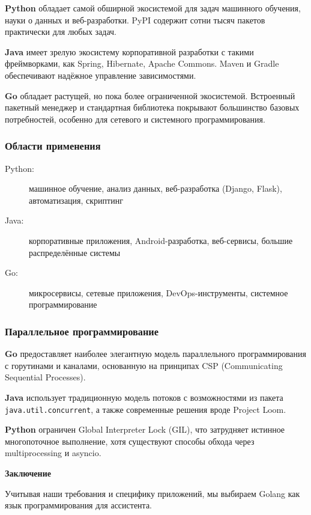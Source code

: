 \textbf{Python} обладает самой обширной экосистемой для задач машинного обучения, науки о данных и веб-разработки. PyPI содержит сотни тысяч пакетов практически для любых задач.

\textbf{Java} имеет зрелую экосистему корпоративной разработки с такими фреймворками, как Spring, Hibernate, Apache Commons. Maven и Gradle обеспечивают надёжное управление зависимостями.

\textbf{Go} обладает растущей, но пока более ограниченной экосистемой. Встроенный пакетный менеджер и стандартная библиотека покрывают большинство базовых потребностей, особенно для сетевого и системного программирования.

\subsubsection*{Области применения}

\begin{description}
    \item[Python:] машинное обучение, анализ данных, веб-разработка (Django, Flask), автоматизация, скриптинг
    \item[Java:] корпоративные приложения, Android-разработка, веб-сервисы, большие распределённые системы
    \item[Go:] микросервисы, сетевые приложения, DevOps-инструменты, системное программирование
\end{description}

\subsubsection*{Параллельное программирование}

\textbf{Go} предоставляет наиболее элегантную модель параллельного программирования с горутинами и каналами, основанную на принципах CSP (Communicating Sequential Processes).

\textbf{Java} использует традиционную модель потоков с возможностями из пакета \texttt{java.util.concurrent}, а также современные решения вроде Project Loom.

\textbf{Python} ограничен Global Interpreter Lock (GIL), что затрудняет истинное многопоточное выполнение, хотя существуют способы обхода через multiprocessing и asyncio\cite{ramalho2015pythonic}.


\textbf{Заключение}

Учитывая наши требования и специфику приложений, мы выбираем Golang как язык программирования для ассистента.

